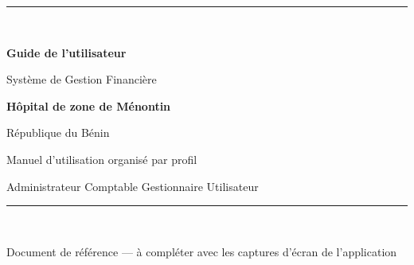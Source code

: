 \begin{titlepage}
\centering
\vspace*{2.2cm}
{\color{primary}\rule{\textwidth}{2pt}}\\[1.2cm]
{\Huge\bfseries\color{darknavy} Guide de l'utilisateur\par}
\vspace{0.6cm}
{\LARGE Système de Gestion Financière\par}
\vspace{1.4cm}
{\Large\bfseries Hôpital de zone de Ménontin\par}
\vspace{0.4cm}
{\large\color{greytext} République du Bénin\par}
\vspace{2.2cm}
{\large Manuel d'utilisation organisé par profil\par}
\vspace{0.3cm}
{\color{greytext} Administrateur \textbullet{} Comptable \textbullet{} Gestionnaire \textbullet{} Utilisateur\par}
\vfill
{\color{primary}\rule{\textwidth}{2pt}}\\[0.5cm]
{\color{greytext} Document de référence — à compléter avec les captures d'écran de l'application\par}
\end{titlepage}
